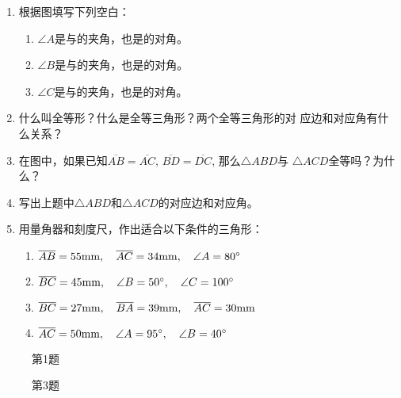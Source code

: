 \begin{ex}
\begin{enumerate}
	\item 根据图填写下列空白：
\begin{enumerate}
	\item $\angle A$是\underline{\qquad }与\underline{\qquad }的夹角，也是\underline{\qquad }的对角。
	\item $\angle B$是\underline{\qquad }与\underline{\qquad }的夹角，也是\underline{\qquad }的对角。
	\item $\angle C$是\underline{\qquad }与\underline{\qquad }的夹角，也是\underline{\qquad }的对角。
\end{enumerate}

	\item 什么叫全等形？什么是全等三角形？两个全等三角形的对
	应边和对应角有什么关系？
	\item 在图中，如果已知$\overline{AB}=\overline{AC}$, $\overline{BD}=\overline{DC}$, 那么$\triangle ABD$与
	$\triangle ACD$全等吗？为什么？

\item 写出上题中$\triangle ABD$和$\triangle ACD$的对应边和对应角。
\item 用量角器和刻度尺，作出适合以下条件的三角形：
\begin{enumerate}
	\item $\overline{AB}=55{\rm mm},\quad \overline{AC}=34{\rm mm},\quad \angle A=80^{\circ}$
\item $\overline{BC}=45{\rm mm},\quad \angle B=50^{\circ},\quad \angle C=100^{\circ}$
\item $\overline{BC}=27{\rm mm},\quad \overline{BA}=39{\rm mm},\quad \overline{AC}=30{\rm mm}$
\item $\overline{AC}=50{\rm mm},\quad \angle A=95^{\circ},\quad \angle B=40^{\circ}$
\end{enumerate}
\end{enumerate}
\end{ex}

\begin{figure}[htp]\centering
    \begin{minipage}[t]{0.48\textwidth}
    \centering
{}
    \caption*{第1题}
    \end{minipage}
    \begin{minipage}[t]{0.48\textwidth}
    \centering
    \caption*{第3题}
    \end{minipage}
    \end{figure}


